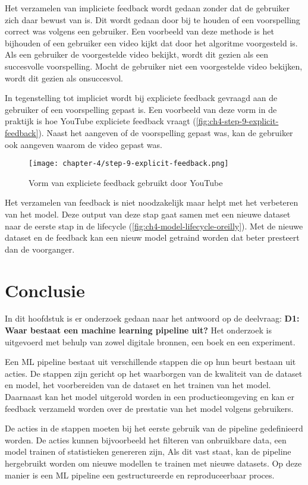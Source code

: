 Het verzamelen van impliciete feedback wordt gedaan zonder dat de gebruiker zich daar bewust van is. Dit wordt gedaan door bij te houden of een voorspelling correct was volgens een gebruiker. Een voorbeeld van deze methode is het bijhouden of een gebruiker een video kijkt dat door het algoritme voorgesteld is. Als een gebruiker de voorgestelde video bekijkt, wordt dit gezien als een succesvolle voorspelling. Mocht de gebruiker niet een voorgestelde video bekijken, wordt dit gezien als onsuccesvol.

In tegenstelling tot impliciet wordt bij expliciete feedback gevraagd aan de gebruiker of een voorspelling gepast is. Een voorbeeld van deze vorm in de praktijk is hoe YouTube expliciete feedback vraagt (\autoref{fig:ch4-step-9-explicit-feedback}). Naast het aangeven of de voorspelling gepast was, kan de gebruiker ook aangeven waarom de video gepast was.

\begin{figure}[hbt!]
  \centering
  \texttt{[image: chapter-4/step-9-explicit-feedback.png]}
  \caption{Vorm van expliciete feedback gebruikt door YouTube}
  \label{fig:ch4-step-9-explicit-feedback}
\end{figure}

Het verzamelen van feedback is niet noodzakelijk maar helpt met het verbeteren van het model. Deze output van deze stap gaat samen met een nieuwe dataset naar de eerste stap in de lifecycle (\autoref{fig:ch4-model-lifecycle-oreilly}). Met de nieuwe dataset en de feedback kan een nieuw model getraind worden dat beter presteert dan de voorganger.

\section{Conclusie}\label{sec:ch4-conclusie}
In dit hoofdstuk is er onderzoek gedaan naar het antwoord op de deelvraag: \textbf{D1: Waar bestaat een machine learning pipeline uit?} Het onderzoek is uitgevoerd met behulp van zowel digitale bronnen, een boek en een experiment.

Een ML pipeline bestaat uit verschillende stappen die op hun beurt bestaan uit acties. De stappen zijn gericht op het waarborgen van de kwaliteit van de dataset en model, het voorbereiden van de dataset en het trainen van het model. Daarnaast kan het model uitgerold worden in een productieomgeving en kan er feedback verzameld worden over de prestatie van het model volgens gebruikers.

De acties in de stappen moeten bij het eerste gebruik van de pipeline gedefinieerd worden. De acties kunnen bijvoorbeeld het filteren van onbruikbare data, een model trainen of statistieken genereren zijn, Als dit vast staat, kan de pipeline hergebruikt worden om nieuwe modellen te trainen met nieuwe datasets. Op deze manier is een ML pipeline een gestructureerde en reproduceerbaar proces.

